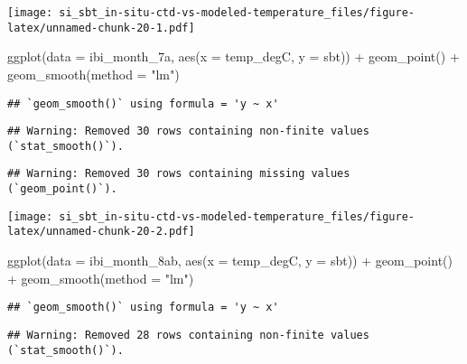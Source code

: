 \documentclass[
]{article}
\newenvironment{Shaded}{\begin{snugshade}}{\end{snugshade}}
\newcommand{\AttributeTok}[1]{\textcolor[rgb]{0.77,0.63,0.00}{#1}}
\newcommand{\FunctionTok}[1]{\textcolor[rgb]{0.00,0.00,0.00}{#1}}
\newcommand{\NormalTok}[1]{#1}
\newcommand{\SpecialCharTok}[1]{\textcolor[rgb]{0.00,0.00,0.00}{#1}}
\newcommand{\StringTok}[1]{\textcolor[rgb]{0.31,0.60,0.02}{#1}}
\begin{document}
\texttt{[image: si\_sbt\_in-situ-ctd-vs-modeled-temperature\_files/figure-latex/unnamed-chunk-20-1.pdf]}

\begin{Shaded}
\begin{Highlighting}[]
\FunctionTok{ggplot}\NormalTok{(}\AttributeTok{data =}\NormalTok{ ibi\_month\_7a, }\FunctionTok{aes}\NormalTok{(}\AttributeTok{x =}\NormalTok{ temp\_degC, }\AttributeTok{y =}\NormalTok{ sbt)) }\SpecialCharTok{+} \FunctionTok{geom\_point}\NormalTok{() }\SpecialCharTok{+} \FunctionTok{geom\_smooth}\NormalTok{(}\AttributeTok{method =} \StringTok{"lm"}\NormalTok{)}
\end{Highlighting}
\end{Shaded}

\begin{verbatim}
## `geom_smooth()` using formula = 'y ~ x'
\end{verbatim}

\begin{verbatim}
## Warning: Removed 30 rows containing non-finite values (`stat_smooth()`).
\end{verbatim}

\begin{verbatim}
## Warning: Removed 30 rows containing missing values (`geom_point()`).
\end{verbatim}

\texttt{[image: si\_sbt\_in-situ-ctd-vs-modeled-temperature\_files/figure-latex/unnamed-chunk-20-2.pdf]}

\begin{Shaded}
\begin{Highlighting}[]
\FunctionTok{ggplot}\NormalTok{(}\AttributeTok{data =}\NormalTok{ ibi\_month\_8ab, }\FunctionTok{aes}\NormalTok{(}\AttributeTok{x =}\NormalTok{ temp\_degC, }\AttributeTok{y =}\NormalTok{ sbt)) }\SpecialCharTok{+} \FunctionTok{geom\_point}\NormalTok{() }\SpecialCharTok{+} \FunctionTok{geom\_smooth}\NormalTok{(}\AttributeTok{method =} \StringTok{"lm"}\NormalTok{)}
\end{Highlighting}
\end{Shaded}

\begin{verbatim}
## `geom_smooth()` using formula = 'y ~ x'
\end{verbatim}

\begin{verbatim}
## Warning: Removed 28 rows containing non-finite values (`stat_smooth()`).
\end{verbatim}
\end{document}
